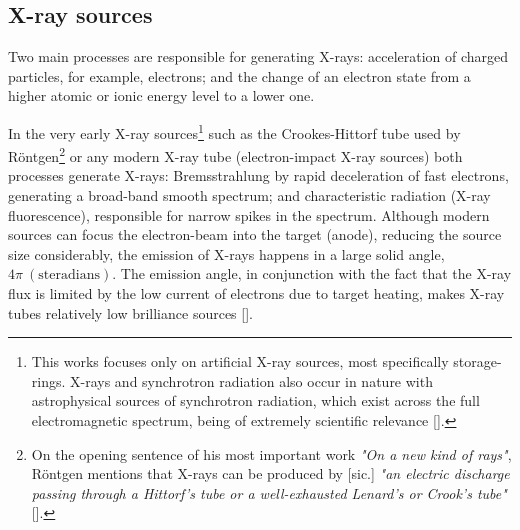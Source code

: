 \begin{refsection}
\subsection{X-ray sources}\label{sec:sources}
Two main processes are responsible for generating X-rays: acceleration of charged particles, for example, electrons; and the change of an electron state from a higher atomic or ionic energy level to a lower one.

In the very early X-ray sources\footnote{This works focuses only on artificial X-ray sources, most specifically storage-rings. X-rays and synchrotron radiation also occur in nature with astrophysical sources of synchrotron radiation, which exist across the full electromagnetic spectrum, being of extremely scientific relevance [\cite{Ginzburg1965,Wielebinski2006}].} such as the Crookes-Hittorf tube used by R\"{o}ntgen\footnote{On the opening sentence of his most important work \textit{"On a new kind of rays"}, R\"{o}ntgen mentions that X-rays can be produced by [sic.] \textit{"an electric discharge passing through a Hittorf's tube or a well-exhausted Lenard's or Crook's tube"} [\cite{Roentgen1896}].} or any modern X-ray tube (electron-impact X-ray sources) both processes generate X-rays: Bremsstrahlung by rapid deceleration of fast electrons, generating a broad-band smooth spectrum; and characteristic radiation (X-ray fluorescence), responsible for narrow spikes in the spectrum. Although modern sources can focus the electron-beam into the target (anode), reducing the source size considerably, the emission of X-rays happens in a large solid angle, $4\pi~(\mathrm{steradians})$. The emission angle, in conjunction with the fact that the X-ray flux is limited by the low current of electrons due to target heating, makes X-ray tubes relatively low brilliance sources [\cite[\textit{§1.6} \& \textit{§2}]{Michette1993}].


\end{refsection}
